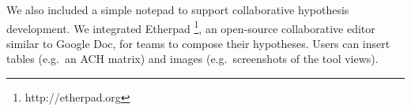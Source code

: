 We also included a simple notepad to support collaborative hypothesis
development. We integrated Etherpad \footnote{http://etherpad.org}, an
open-source collaborative editor similar to Google Doc, for teams to
compose their hypotheses. Users can insert tables (e.g.~an ACH matrix)
and images (e.g.~screenshots of the tool views).
